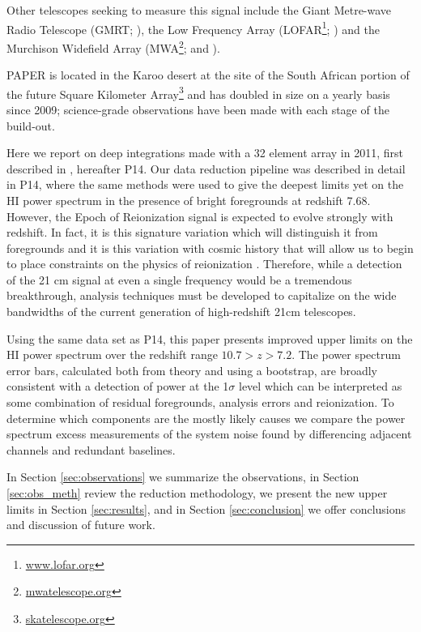 \documentclass[preprint2]{aastex}
\begin{document}
Other telescopes seeking to measure this signal include the Giant Metre-wave Radio Telescope (GMRT; \cite{Paciga:2013p9943}), the Low Frequency Array (LOFAR\footnote{\url{www.lofar.org}}; \cite{Yatawatta:2013p9699}) and the Murchison Widefield Array (MWA\footnote{\url{mwatelescope.org}}; \cite{Bowman:2013p9950} and \cite{Tingay:2013p9022}). 



PAPER is located in the Karoo desert at the site of the South African portion of the future Square Kilometer Array\footnote{\url{skatelescope.org}} and has doubled in size on a yearly basis since 2009; science-grade observations have been made with each stage of the build-out.  

Here we report on deep integrations made with a 32 element array in 2011, first described in \cite{Parsons:2014p10499}, hereafter P14.  Our data reduction pipeline was described in detail in P14, where the same methods were used to give the deepest limits yet on the HI power spectrum in the presence of bright foregrounds at redshift 7.68.  However, the Epoch of Reionization signal is expected to evolve strongly with redshift. In fact, it is this signature variation which will distinguish it from foregrounds and it is this variation with cosmic history that will allow us to begin to place constraints on the physics of reionization \citep{Pritchard:2008p8123,Pober:2014p10390}.  Therefore, while a detection of the 21 cm signal at even a single frequency would be a tremendous breakthrough, analysis techniques must be developed to capitalize on the wide bandwidths of the current generation of high-redshift 21cm telescopes.  

Using the same data set as P14, this paper presents improved upper limits on the HI power spectrum over the redshift range $10.7>z>7.2$.  The power spectrum error bars, calculated both from theory and using a bootstrap, are broadly consistent with a detection of power at the 1$\sigma$ level which can be interpreted as some combination of residual foregrounds, analysis errors and reionization. To determine which components are the mostly likely causes we compare the power spectrum excess measurements of the system noise found by differencing adjacent channels and redundant baselines.

 In Section  \ref{sec:observations} we summarize the observations, in Section \ref{sec:obs_meth} review the reduction methodology, we present the new upper limits in Section \ref{sec:results}, and in Section \ref{sec:conclusion} we offer conclusions and discussion of future work.
\end{document}
